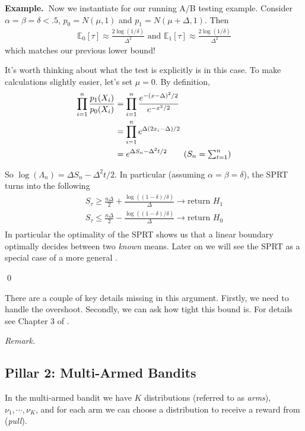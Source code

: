\documentclass[11pt]{article}
\newcommand{\example}{\noindent\textbf{Example.\  }}
\newcommand{\remark}{\noindent\textit{Remark.}}
\newcommand{\E}{\mathbb{E}}
\newcommand{\1}{\mathbf{1}}
\begin{document}
\example Now we instantiate for our running A/B testing example. Consider $\alpha = \beta = \delta < .5$, $p_0 = N(\mu,1)$ and $p_1 = N(\mu+\Delta, 1)$. Then
\begin{align}
    \E_0[\tau] \approx \frac{2\log(1/\delta)}{\Delta^2} \text{ and } \E_1[\tau] \approx \frac{2\log(1/\delta)}{\Delta^2}
\end{align}
which matches our previous lower bound!

It's worth thinking about what the test is explicitly is in this case. To make calculations slightly easier, let's set $\mu = 0$. By definition,
\begin{align*}
    \prod_{i=1}^n \frac{p_1(X_i)}{p_0(X_i)}
    &= \prod_{i=1}^n \frac{e^{-(x-\Delta)^2/2}}{e^{-x^2/2}}\\
    &= \prod_{i=1}^n e^{\Delta(2x_i-\Delta)/2}\\
    &= e^{\Delta S_n-\Delta^2t/2} \tag{$S_n = \sum_{t=1}^n$}
\end{align*}

So $\log(\Lambda_n) = \Delta S_n-\Delta^2t/2$. In particular (assuming $\alpha = \beta = \delta$), the SPRT turns into the following 
\begin{align*}
    S_{\tau} \geq \frac{n\Delta}{2} +  \frac{\log((1-\delta)/\delta)}{\Delta} \rightarrow \text{return $H_1$}\\
    S_{\tau} \leq \frac{n\Delta}{2} -  \frac{\log((1-\delta)/\delta)}{\Delta} \rightarrow \text{return $H_0$}\\
\end{align*}
In particular the optimality of the SPRT shows us that a linear boundary optimally decides between two \textit{known} means. Later on we will see the SPRT as a special case of a more general .

\qed


There are a couple of key details missing in this argument. Firstly, we need to handle the overshoot. Secondly, we can ask how tight this bound is. For details see Chapter 3 of \cite{tartakovsky2014sequential}.

\remark

\subsection{Pillar 2: Multi-Armed Bandits}

In the multi-armed bandit we have $K$ distributions (referred to as \textit{arms}), $\nu_1, \cdots, \nu_K$, and for each arm we can choose a distribution to receive a reward from (\textit{pull}). 
\end{document}

